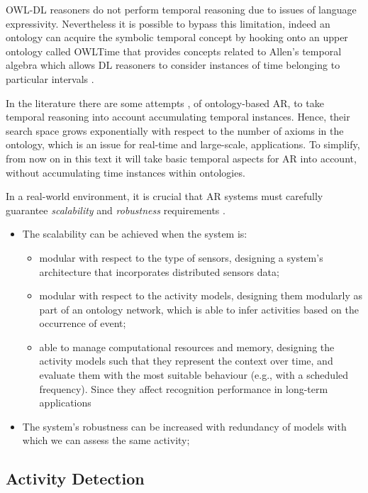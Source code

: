 \documentclass{thesisreport}
\begin{document}
  OWL-DL reasoners do not perform temporal reasoning due to issues of language expressivity. Nevertheless it is possible to bypass this limitation, indeed an ontology can acquire the symbolic temporal concept by hooking onto an upper ontology called OWLTime that provides concepts related to Allen’s temporal algebra which allows DL reasoners to consider instances of time belonging to particular intervals \cite{kareem2018arianna}.
  
  In the literature there are some attempts \cite{scalmato2013describing,buoncompagni2017towards}, of ontology-based AR, to take temporal reasoning into account accumulating temporal instances. Hence, their search space grows exponentially \cite{salguero2018using} with respect to the number of axioms in the ontology, which is an issue for real-time and large-scale,  applications. 
  To simplify, from now on in this text it will take basic temporal aspects for AR into account, without accumulating time instances within ontologies.

 
 In a real-world environment, it is crucial that AR systems must carefully guarantee \textit{scalability} and \textit{robustness} requirements \cite{kareem2018arianna}.
 \begin{itemize}
     \item The scalability can be achieved when the system is:
     \begin{itemize}
         \item modular with respect to the type of sensors, designing a system’s architecture that incorporates distributed sensors data;
         \item modular with respect to the activity models, designing them modularly as part of an ontology network, which is able to infer activities based on the occurrence of event;
         \item able to manage computational resources and memory, designing the activity models such that they represent the context over time, and evaluate them with the most suitable behaviour (e.g., with a scheduled frequency). Since they affect recognition performance in long-term applications 
     \end{itemize}
     \item The system’s robustness can be increased with redundancy of models with which we can assess the same activity;
 \end{itemize}
 
 
 \subsection{Activity Detection}
\end{document}
